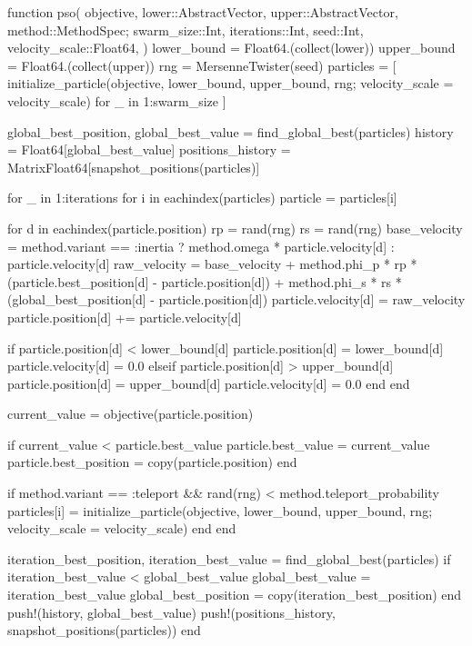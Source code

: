 \documentclass[a4paper, 14pt]{extarticle}
\begin{document}
\begin{breakablelisting}
function pso(
    objective,
    lower::AbstractVector,
    upper::AbstractVector,
    method::MethodSpec;
    swarm_size::Int,
    iterations::Int,
    seed::Int,
    velocity_scale::Float64,
)
    lower_bound = Float64.(collect(lower))
    upper_bound = Float64.(collect(upper))
    rng = MersenneTwister(seed)
    particles = [
        initialize_particle(objective, lower_bound, upper_bound, rng; velocity_scale = velocity_scale)
        for _ in 1:swarm_size
    ]

    global_best_position, global_best_value = find_global_best(particles)
    history = Float64[global_best_value]
    positions_history = Matrix{Float64}[snapshot_positions(particles)]

    for _ in 1:iterations
        for i in eachindex(particles)
            particle = particles[i]

            for d in eachindex(particle.position)
                rp = rand(rng)
                rs = rand(rng)
                base_velocity = method.variant == :inertia ? method.omega * particle.velocity[d] : particle.velocity[d]
                raw_velocity =
                    base_velocity +
                    method.phi_p * rp * (particle.best_position[d] - particle.position[d]) +
                    method.phi_s * rs * (global_best_position[d] - particle.position[d])
                particle.velocity[d] = raw_velocity
                particle.position[d] += particle.velocity[d]

                if particle.position[d] < lower_bound[d]
                    particle.position[d] = lower_bound[d]
                    particle.velocity[d] = 0.0
                elseif particle.position[d] > upper_bound[d]
                    particle.position[d] = upper_bound[d]
                    particle.velocity[d] = 0.0
                end
            end

            current_value = objective(particle.position)

            if current_value < particle.best_value
                particle.best_value = current_value
                particle.best_position = copy(particle.position)
            end

            if method.variant == :teleport && rand(rng) < method.teleport_probability
                particles[i] = initialize_particle(objective, lower_bound, upper_bound, rng; velocity_scale = velocity_scale)
            end
        end

        iteration_best_position, iteration_best_value = find_global_best(particles)
        if iteration_best_value < global_best_value
            global_best_value = iteration_best_value
            global_best_position = copy(iteration_best_position)
        end
        push!(history, global_best_value)
        push!(positions_history, snapshot_positions(particles))
    end


\end{breakablelisting}
\end{document}
